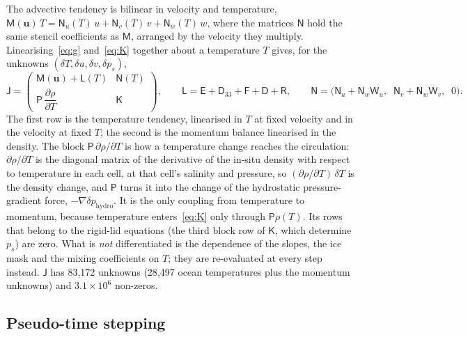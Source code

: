 \documentclass{article}
\begin{document}
The advective tendency is bilinear in velocity and temperature, $\mathsf{M}(\mathbf{u})\,T = \mathsf{N}_u(T)\,u + \mathsf{N}_v(T)\,v + \mathsf{N}_w(T)\,w$, where the matrices $\mathsf{N}$ hold the same stencil coefficients as $\mathsf{M}$, arranged by the velocity they multiply. Linearising~\eqref{eq:g} and~\eqref{eq:K} together about a temperature $T$ gives, for the unknowns $(\delta T, \delta u, \delta v, \delta p_s)$,
\begin{equation}
\mathsf{J} =
\begin{pmatrix}
\mathsf{M}(\mathbf{u}) + \mathsf{L}(T) & \mathsf{N}(T) \\
\mathsf{P}\,\dfrac{\partial\rho}{\partial T} & \mathsf{K}
\end{pmatrix},
\qquad
\mathsf{L} = \mathsf{E} + \mathsf{D}_{33} + \mathsf{F} + \mathsf{D} + \mathsf{R},
\qquad
\mathsf{N} = \big( \mathsf{N}_u + \mathsf{N}_w\mathsf{W}_u,\;\; \mathsf{N}_v + \mathsf{N}_w\mathsf{W}_v,\;\; 0 \big).
\label{eq:J}
\end{equation}
The first row is the temperature tendency, linearised in $T$ at fixed velocity and in the velocity at fixed $T$; the second is the momentum balance linearised in the density.
The block $\mathsf{P}\,\partial\rho/\partial T$ is how a temperature change reaches the circulation: $\partial\rho/\partial T$ is the diagonal matrix of the derivative of the in-situ density with respect to temperature in each cell, at that cell's salinity and pressure, so $(\partial\rho/\partial T)\,\delta T$ is the density change, and $\mathsf{P}$ turns it into the change of the hydrostatic pressure-gradient force, $-\nabla\delta p_\text{hydro}$. It is the only coupling from temperature to momentum, because temperature enters~\eqref{eq:K} only through $\mathsf{P}\rho(T)$. Its rows that belong to the rigid-lid equations (the third block row of $\mathsf{K}$, which determine $p_s$) are zero. What is \emph{not} differentiated is the dependence of the slopes, the ice mask and the mixing coefficients on $T$; they are re-evaluated at every step instead. $\mathsf{J}$ has 83{,}172 unknowns (28{,}497 ocean temperatures plus the momentum unknowns) and $3.1\times10^{6}$ non-zeros.

\subsection{Pseudo-time stepping}\label{sec:pseudo}
\end{document}
